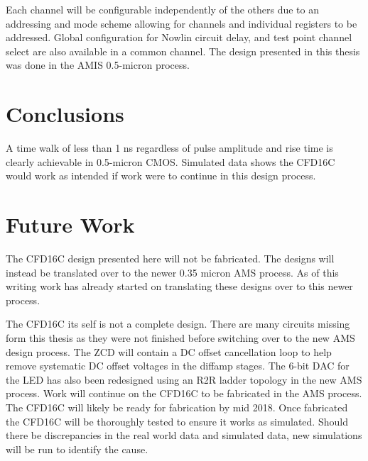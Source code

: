 \documentclass[12pt,oneside,final]{siuethesis}
\theoremstyle{definition}
\begin{document}
\par Each channel will be configurable independently of the others due to an addressing and mode scheme allowing for channels and individual registers to be addressed. Global configuration for Nowlin circuit delay, and test point channel select are also available in a common channel. The design presented in this thesis was done in the AMIS 0.5-micron process.

\section{Conclusions}
\par A time walk of less than 1 ns regardless of pulse amplitude and rise time is clearly achievable in 0.5-micron CMOS. Simulated data shows the CFD16C would work as intended if work were to continue in this design process.

\section{Future Work}
\par  The CFD16C design presented here will not be fabricated. The designs will instead be translated over to the newer 0.35 micron AMS process. As of this writing work has already started on translating these designs over to this newer process. 
\par The CFD16C its self is not a complete design. There are many circuits missing form this thesis as they were not finished before switching over to the new AMS design process. The ZCD will contain a DC offset cancellation loop to help remove systematic DC offset voltages in the diffamp stages. The 6-bit DAC for the LED has also been redesigned using an R2R ladder topology in the new AMS process. Work will continue on the CFD16C to be fabricated in the AMS process. The CFD16C will likely be ready for fabrication by mid 2018. Once fabricated the CFD16C will be thoroughly tested to ensure it works as simulated. Should there be discrepancies in the real world data and simulated data, new simulations will be run to identify the cause. 






\end{document}
